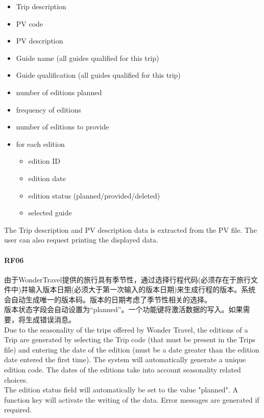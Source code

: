 \begin{itemize}
\tightlist
\item
  Trip description
\item
  PV code
\item
  PV description
\item
  Guide name (all guides qualified for this trip)
\item
  Guide qualification (all guides qualified for this trip)
\item
  number of editions planned
\item
  frequency of editions
\item
  number of editions to provide
\item
  for each edition

  \begin{itemize}
  \tightlist
  \item
    edition ID
  \item
    edition date
  \item
    edition status (planned/provided/deleted)
  \item
    selected guide\\
  \end{itemize}
\end{itemize}

The Trip description and PV description data is extracted from the PV
file. The user can also request printing the displayed data.

\hypertarget{rf06-1}{%
\paragraph{RF06}\label{rf06-1}}

由于WonderTravel提供的旅行具有季节性，通过选择行程代码(必须存在于旅行文件中)并输入版本日期(必须大于第一次输入的版本日期)来生成行程的版本。系统会自动生成唯一的版本码。版本的日期考虑了季节性相关的选择。\\
版本状态字段会自动设置为``planned''。一个功能键将激活数据的写入。如果需要，将生成错误消息。\\
Due to the seasonality of the trips offered by Wonder Travel, the
editions of a Trip are generated by selecting the Trip code (that must
be present in the Trips file) and entering the date of the edition (must
be a date greater than the edition date entered the first time). The
system will automatically generate a unique edition code. The dates of
the editions take into account seasonality related choices.\\
The edition status field will automatically be set to the value
"planned". A function key will activate the writing of the data. Error
messages are generated if required.


